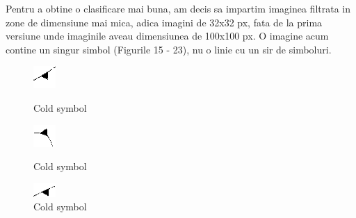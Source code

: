 \documentclass{article}
\begin{document}
  \newpage
  Pentru a obtine o clasificare mai buna, am decis sa impartim imaginea filtrata in zone de dimensiune mai mica, adica imagini de 32x32 px, fata de la prima versiune unde imaginile aveau dimensiunea de 100x100 px.
  O imagine acum contine un singur simbol (Figurile 15 - 23), nu o linie cu un sir de simboluri.
  
  \begin{figure}[!htb]
    \begin{minipage}{0.3\textwidth}
      \centering
      \includegraphics[width=.35\linewidth]{cold1.png}
      \caption{Cold symbol}\label{Fig:Cold1}
    \end{minipage}\hfill
    \begin{minipage}{0.3\textwidth}
      \centering
      \includegraphics[width=.35\linewidth]{cold2.png}
      \caption{Cold symbol}\label{Fig:Cold2}
    \end{minipage}
    \begin{minipage}{0.3\textwidth}
      \centering
      \includegraphics[width=.35\linewidth]{cold3.png}
      \caption{Cold symbol}\label{Fig:Cold3}
    \end{minipage}
 \end{figure}
 
\end{document}
